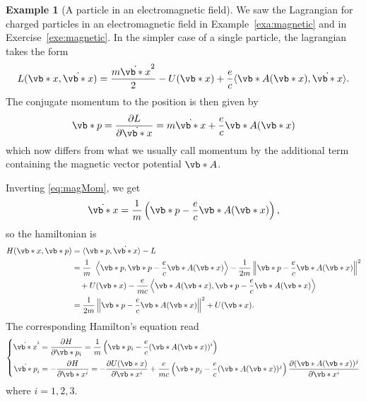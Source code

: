 \documentclass[english,fontsize=11pt,paper=b5]{scrbook}
\numberwithin{equation}{chapter}
\theoremstyle{definition}
\newtheorem{example}{Example}[chapter]
\begin{document}
    \begin{example}[A particle in an electromagnetic field]\label{exe:magneticH}
      We saw the Lagrangian for charged particles in an electromagnetic field in Example~\ref{exa:magnetic} and in Exercise~\ref{exe:magnetic}.
      In the simpler case of a single particle, the lagrangian takes the form
      \begin{equation}
        L(\vb*{x},\dot{\vb*{x}}) = \frac{m \dot{\vb*{x}}^2}{2} - U(\vb*{x}) + \frac ec \langle\vb* A(\vb*{x}), \dot{\vb*{x}}\rangle.
      \end{equation}
      The conjugate momentum to the position is then given by
      \begin{equation}\label{eq:magMom}
        \vb*{p} = \frac{\partial L}{\partial \dot{\vb*{x}}} = m \dot{\vb*{x}} + \frac{e}{c}\vb* A(\vb*{x})
      \end{equation}
      which now differs from what we usually call momentum by the additional term containing the magnetic vector potential $\vb* A$.

      Inverting \eqref{eq:magMom}, we get
      \begin{equation}
        \dot{\vb*{x}} = \frac1m \left( \vb*{p} - \frac{e}{c}\vb* A(\vb*{x}) \right),
      \end{equation}
      so the hamiltonian is
      \begin{align}
        H(\vb*{x}, \vb*{p}) & = \langle\vb*{p}, \dot{\vb*{x}}\rangle - L                                        \\
                            & = \frac1m\ \left\langle \vb*{p}, \vb*{p} - \frac{e}{c}\vb* A(\vb*{x})\right\rangle -
                            \frac1{2m}\left\|\vb*{p} - \frac{e}{c}\vb* A(\vb*{x})\right\|^2                                \\
                            & \quad + U(\vb*{x})
                            - \frac e{mc} \left\langle\vb* A(\vb*{x}), \vb*{p} - \frac{e}{c}\vb* A(\vb*{x})\right\rangle
                            \\
                            & = \frac1{2m}\left\|\vb*{p} - \frac{e}{c}\vb* A(\vb*{x})\right\|^2 + U(\vb*{x}).
      \end{align}
      The corresponding Hamilton's equation read
      \begin{equation}
        \left\lbrace
          \begin{aligned}
            \dot{\vb*{x}}^i & = \frac{\partial H}{\partial \vb*{p}_i} = \frac1m \left(\vb*{p}_i - \frac{e}{c}(\vb* A(\vb*{x}))^i\right)                                                                                               \\
            \dot{\vb*{p}}_i & = -\frac{\partial H}{\partial \vb*{x}^i} = -\frac{\partial U(\vb*{x})}{\partial \vb*{x}^i} + \frac{e}{mc} \left(\vb*{p}_j - \frac{e}{c}(\vb* A(\vb*{x}))^j\right)\frac{\partial (\vb* A(\vb*{x}))^j}{\partial \vb*{x}^i}
          \end{aligned}
        \right.
      \end{equation}
      where $i=1,2,3$.


\end{example}
\end{document}
